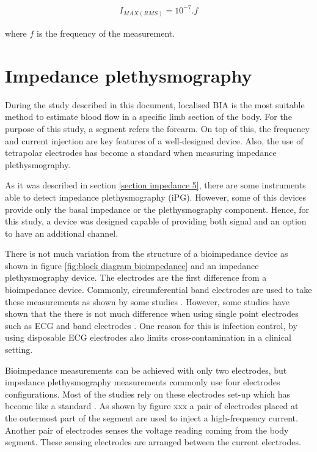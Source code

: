 \begin{align}
	\label{eq:current body}
     I_{MAX(RMS)} = 10^{-7}.f
\end{align}

where $f$ is the frequency of the measurement.

\section{Impedance plethysmography} %
\label{section impedance 8}
During the study described in this document, localised BIA is the most suitable method to estimate blood flow in a specific limb section of the body. For the purpose of this study, a segment refers the forearm. On top of this, the frequency and current injection are key features of a well-designed device. Also, the use of tetrapolar electrodes has become a standard when measuring impedance plethysmography. 

As it was described in section \ref{section impedance 5}, there are some instruments able to detect impedance plethysmography (iPG). However, some of this devices provide only the basal impedance or the plethysmography component. Hence, for this study, a device was designed capable of providing both signal and an option to have an additional channel.

There is not much variation from the structure of a bioimpedance device as shown in figure \ref{fig:block diagram bioimpedance} and an impedance plethysmography device. The electrodes are the first difference from a bioimpedance device. Commonly, circumferential band electrodes are used to take these measurements as shown by some studies . However, some studies have shown that the there is not much difference when using single point electrodes such as ECG and band electrodes . One reason for this is infection control, by using disposable ECG electrodes also limits cross-contamination in a clinical setting.

Bioimpedance measurements can be achieved with only two electrodes, but impedance plethysmography measurements commonly use four electrodes configurations. Most of the studies rely on these electrodes set-up which has become like a standard . As shown by figure xxx a pair of electrodes placed at the outermost part of the segment are used to inject a high-frequency current. Another pair of electrodes senses the voltage reading coming from the body segment. These sensing electrodes are arranged between the current electrodes. 

